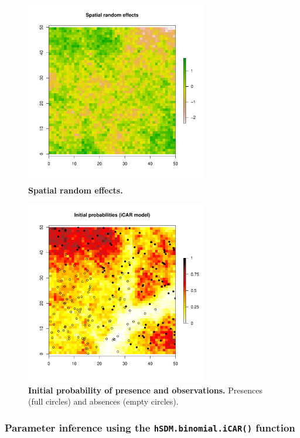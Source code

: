 \documentclass[a4paper, 12pt, leqno]{article}\usepackage[]{graphicx}\usepackage[]{color}
\begin{document}
\begin{figure} 
  \centering \includegraphics[width=8cm]{figures/binom-iCAR-plots1.pdf}
  \caption{\textbf{Spatial random effects.}}
  \label{fig:binom-iCAR-plots1-2}
\end{figure}

\begin{figure} 
  \centering \includegraphics[width=8cm]{figures/binom-iCAR-plots2.pdf}
  \caption{\textbf{Initial probability of presence and observations.} 
    Presences (full circles) and absences (empty circles).}
  \label{fig:binom-iCAR-plots3}
\end{figure}

\subsubsection{Parameter inference using the \texttt{hSDM.binomial.iCAR()} function}
\end{document}
